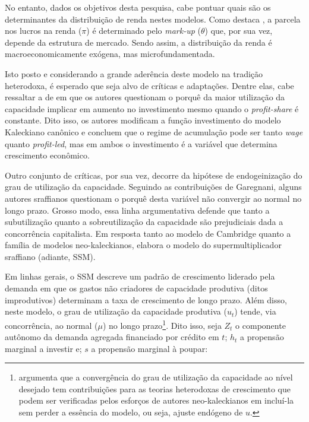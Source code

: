 No entanto, dados os objetivos desta pesquisa, cabe pontuar quais são os determinantes da distribuição de renda nestes modelos. Como destaca \textcite[Capítulo 5]{hein_distribution_2014}, a parcela nos lucros na renda ($\pi$) é determinado pelo \textit{mark-up} ($\theta$) que, por sua vez, depende da estrutura de mercado. Sendo assim, a distribuição da renda é macroeconomicamente exógena, mas microfundamentada.

Isto posto e considerando a grande aderência deste modelo na tradição heterodoxa,  é esperado que seja alvo de críticas e adaptações. Dentre elas, cabe ressaltar a de \textcite{bhaduri_unemployment_1990} em que os autores questionam o porquê da maior utilização da capacidade implicar em aumento no investimento mesmo quando o \textit{profit-share} é constante. Dito isso, os autores modificam a função investimento do modelo Kaleckiano canônico e concluem que o regime de acumulação pode ser tanto \textit{wage} quanto \textit{profit-led}, mas em ambos o investimento é a variável que determina crescimento econômico. 


Outro conjunto de críticas, por sua vez, decorre da hipótese de endogeinização do grau de utilização da capacidade. Seguindo as contribuições de Garegnani, alguns autores sraffianos questionam o porquê desta variável não convergir ao normal no longo prazo. Grosso modo, essa linha argumentativa defende que tanto a subutilização quanto a sobreutilização da capacidade são prejudiciais dada a concorrência capitalista. Em resposta tanto ao modelo de Cambridge quanto a família de modelos neo-kaleckianos, \textcite{serrano_sraffian_1995} elabora o modelo do supermultiplicador sraffiano  (adiante, SSM).

Em linhas gerais, o SSM descreve um padrão de crescimento liderado pela demanda em que os gastos não criadores de capacidade produtiva (ditos improdutivos) determinam a taxa de crescimento de longo prazo. Além disso, neste modelo, o grau de utilização da capacidade produtiva ($u_t$) tende, via concorrência, ao normal ($\mu$) no longo prazo\footnote{\textcite{nikiforos_comments_2018} argumenta que a convergência do grau de utilização da capacidade ao nível desejado tem contribuições para as teorias heterodoxas de crescimento que podem ser verificadas pelos esforços de autores neo-kaleckianos em incluí-la sem perder a essência do modelo, ou seja, ajuste endógeno de $u$.}.
Dito isso, seja $Z_t$ o componente autônomo da demanda agregada financiado por crédito em $t$; $h_t$ a propensão marginal a investir e; $s$ a propensão marginal à poupar:

